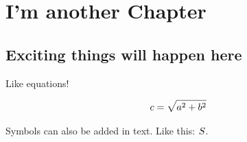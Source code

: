 \chapter{I'm another Chapter}

\section{Exciting things will happen here}

Like equations!

\begin{equation}\label{eq:equation1}
c = \sqrt{a^2 + b^2}\addsymbol{$c$}{I'm a symbol called $c$}
\end{equation}

Symbols can also be added in text.  Like this: $S\addsymbol{$S$}{I'm a symbol called $S$}$.